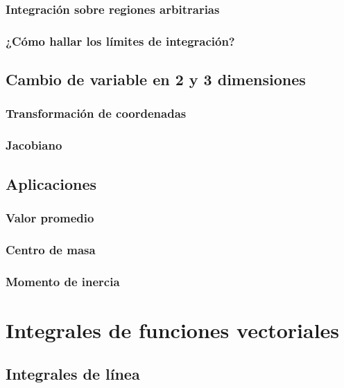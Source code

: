 \documentclass[12pt, fleqn]{report}                             %
\theoremstyle{break}                                            %
\begin{document}
            \subsection{Integración sobre regiones arbitrarias}
            
            \subsection{¿Cómo hallar los límites de integración?}
            
        \section{Cambio de variable en 2 y 3 dimensiones}
        
            \subsection{Transformación de coordenadas}
            
            \subsection{Jacobiano}
            
        \section{Aplicaciones}
        
            \subsection{Valor promedio}
            
            \subsection{Centro de masa}
            
            \subsection{Momento de inercia}
        
    \chapter{Integrales de funciones vectoriales}
    
        \section{Integrales de línea}
        
\end{document}
